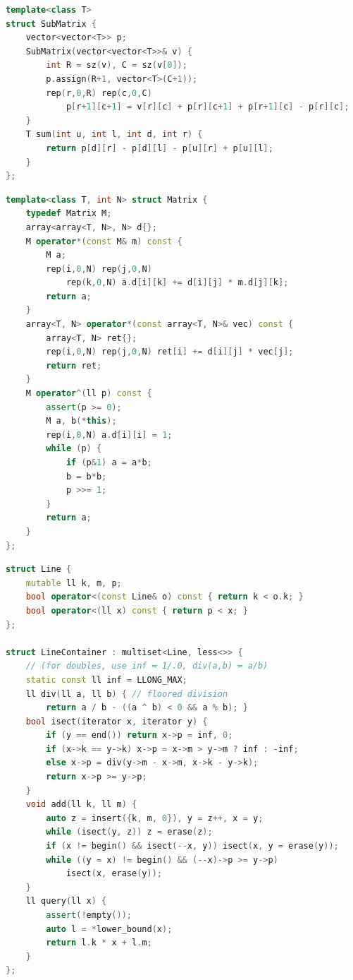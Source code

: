 \begin{multicols}{\Columns}
\begin{lstlisting}[language=C++]
template<class T>
struct SubMatrix {
	vector<vector<T>> p;
	SubMatrix(vector<vector<T>>& v) {
		int R = sz(v), C = sz(v[0]);
		p.assign(R+1, vector<T>(C+1));
		rep(r,0,R) rep(c,0,C)
			p[r+1][c+1] = v[r][c] + p[r][c+1] + p[r+1][c] - p[r][c];
	}
	T sum(int u, int l, int d, int r) {
		return p[d][r] - p[d][l] - p[u][r] + p[u][l];
	}
};
\end{lstlisting}

\begin{lstlisting}[language=C++]
template<class T, int N> struct Matrix {
	typedef Matrix M;
	array<array<T, N>, N> d{};
	M operator*(const M& m) const {
		M a;
		rep(i,0,N) rep(j,0,N)
			rep(k,0,N) a.d[i][k] += d[i][j] * m.d[j][k];
		return a;
	}
	array<T, N> operator*(const array<T, N>& vec) const {
		array<T, N> ret{};
		rep(i,0,N) rep(j,0,N) ret[i] += d[i][j] * vec[j];
		return ret;
	}
	M operator^(ll p) const {
		assert(p >= 0);
		M a, b(*this);
		rep(i,0,N) a.d[i][i] = 1;
		while (p) {
			if (p&1) a = a*b;
			b = b*b;
			p >>= 1;
		}
		return a;
	}
};
\end{lstlisting}

\begin{lstlisting}[language=C++]
struct Line {
	mutable ll k, m, p;
	bool operator<(const Line& o) const { return k < o.k; }
	bool operator<(ll x) const { return p < x; }
};

struct LineContainer : multiset<Line, less<>> {
	// (for doubles, use inf = 1/.0, div(a,b) = a/b)
	static const ll inf = LLONG_MAX;
	ll div(ll a, ll b) { // floored division
		return a / b - ((a ^ b) < 0 && a % b); }
	bool isect(iterator x, iterator y) {
		if (y == end()) return x->p = inf, 0;
		if (x->k == y->k) x->p = x->m > y->m ? inf : -inf;
		else x->p = div(y->m - x->m, x->k - y->k);
		return x->p >= y->p;
	}
	void add(ll k, ll m) {
		auto z = insert({k, m, 0}), y = z++, x = y;
		while (isect(y, z)) z = erase(z);
		if (x != begin() && isect(--x, y)) isect(x, y = erase(y));
		while ((y = x) != begin() && (--x)->p >= y->p)
			isect(x, erase(y));
	}
	ll query(ll x) {
		assert(!empty());
		auto l = *lower_bound(x);
		return l.k * x + l.m;
	}
};
\end{lstlisting}


\end{multicols}
